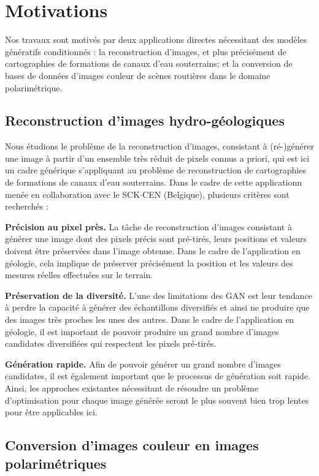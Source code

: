 {\section*{Motivations}

\quad Nos travaux sont motivés par deux applications directes nécessitant des modèles génératifs conditionnés : la reconstruction d'images, et plus précisément de cartographies de formations de canaux d'eau souterrains; et la conversion de bases de données d'images couleur de scènes routières dans le domaine polarimétrique. 

\subsection*{Reconstruction d'images hydro-géologiques}

Nous étudions le problème de la reconstruction d'images, consistant à (ré-)générer une image à partir d'un ensemble très réduit de pixels connus a priori, qui est ici un cadre générique s'appliquant au problème de reconstruction de cartographies de formations de canaux d'eau souterrains. Dans le cadre de cette applicationn menée en collaboration avec le SCK$\cdot$CEN (Belgique), plusieurs critères sont recherchés :

\textbf{Précision au pixel près.} La tâche de reconstruction d'images consistant à générer une image dont des pixels précis sont pré-tirés, leurs positions et valeurs doivent être préservées dans l'image obtenue. Dans le cadre de l'application en géologie, cela implique de préserver précisément la position et les valeurs des mesures réelles effectuées sur le terrain.

\textbf{Préservation de la diversité.} L'une des limitations des \ac{GAN} est leur tendance à perdre la capacité à générer des échantillons diversifiés et ainsi ne produire que des images très proches les unes des autres. Dans le cadre de l'application en géologie, il est important de pouvoir produire un grand nombre d'images candidates diversifiées qui respectent les pixels pré-tirés.

\textbf{Génération rapide.} Afin de pouvoir générer un grand nombre d'images  candidates, il est également important que le processus de génération soit rapide. Ainsi, les approches existantes nécessitant de résoudre un problème d'optimisation pour chaque image générée seront le plus souvent bien trop lentes pour être applicables ici.

\subsection*{Conversion d'images couleur en images polarimétriques}

}
